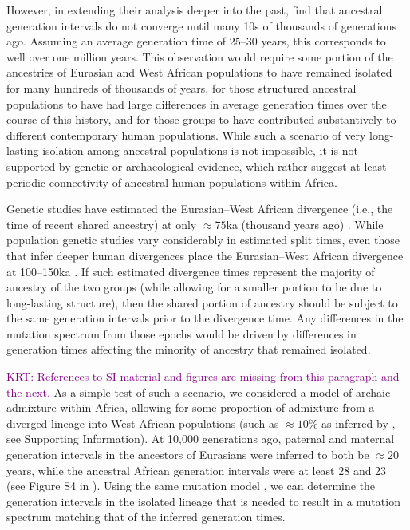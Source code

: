 \documentclass[]{article}
\newcommand{\krtcomment}[1]{{\textcolor{purple}{KRT: #1}}}
\begin{document}
However, in extending their analysis deeper into the past,
\citet{wang2023human} find that ancestral generation intervals do not converge
until many 10s of thousands of generations ago. Assuming an average generation
time of 25--30 years, this corresponds to well over one million years. This
observation would require some portion of the ancestries of Eurasian and West
African populations to have remained isolated for many hundreds of thousands of
years, for those structured ancestral populations to have had large differences
in average generation times over the course of this history, and for those
groups to have contributed substantively to different contemporary human
populations. While such a scenario of very long-lasting isolation among
ancestral populations is not impossible, it is not supported by genetic
\citep{ragsdale2022weakly} or archaeological
\citep{scerri2018did} evidence, which rather suggest at least periodic
connectivity of ancestral human populations within Africa.

Genetic studies have estimated the Eurasian--West African divergence (i.e., the
time of recent shared ancestry) at only $\approx 75$ka (thousand years ago)
\citep[e.g.,][]{pagani2015tracing,bergstrom2020insights}. While population
genetic studies vary considerably in estimated split times, even those that
infer deeper human divergences place the Eurasian--West African divergence at
100--150ka \citep[e.g.,][]{schlebusch2017southern}. If such estimated
divergence times represent the majority of ancestry of the two groups (while
allowing for a smaller portion to be due to long-lasting structure), then the
shared portion of ancestry should be subject to the same generation intervals
prior to the divergence time. Any differences in the mutation spectrum from
those epochs would be driven by differences in generation times affecting the
minority of ancestry that remained isolated. 

\krtcomment{References to SI material and figures are missing from this paragraph and the next.}
As a simple test of such a scenario, we considered a model of archaic admixture
within Africa, allowing for some proportion of admixture from a diverged
lineage into West African populations (such as $\approx10\%$ as inferred by
\citet{durvasula2020recovering}, see Supporting Information). At 10,000
generations ago, paternal and maternal generation intervals in the ancestors of
Eurasians were inferred to both be $\approx20$ years, while the ancestral
African generation intervals were at least 28 and 23 (see Figure S4 in
\citet{wang2023human}). Using the same mutation model
\citep{jonsson2017parental}, we can determine the generation intervals in the
isolated lineage that is needed to result in a mutation spectrum matching that
of the inferred generation times.
\end{document}
